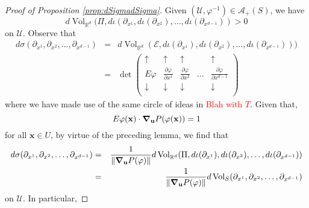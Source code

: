 \documentclass{article}
\renewcommand\det{\operatorname{det}}
\newcommand{\p}{\partial}
\newcommand{\f}[2]{\frac{#1}{#2}}
\theoremstyle{theorem}
\newcommand{\Vol}{\operatorname{Vol}}
\begin{document}
\begin{proof}[Proof of Proposition \ref{prop:dSigmadSigma}]
Given $(\mathcal{U},\varphi^{-1})\in\mathcal{A}_+(S)$, we have
\begin{equation*}
d\Vol_{\mathbb{R}^d}(\Pi,d\iota (\partial_{x^1}, d\iota(\partial_{x^2}),\dots,d\iota(\partial_{x^{d-1}}))>0
\end{equation*}
on $\mathcal{U}$. Observe that
\begin{eqnarray*}
d\sigma(\partial_{x^1},\partial_{x^2},\dots,\partial_{x^{d-1}}) &=& d\Vol_{\mathbb{R}^d}(\mathcal{E},d\iota(\partial_{x^1}),d\iota(\partial_{x^2}),\dots,d\iota(\partial_{x^{d-1}})))\\ 
&=& \det\begin{pmatrix}
    \uparrow & \uparrow & \uparrow & & \uparrow\\
    E \varphi & \f{\p\varphi}{\p x^1} & \f{\p\varphi}{\p x^2} & \dots & \f{\p\varphi}{\p x^{d-1}}  \\
    \downarrow & \downarrow & \downarrow & & \downarrow\\
    \end{pmatrix}
\end{eqnarray*}
where we have made use of the same circle of ideas in \textcolor{red}{Blah with $T$}. Given that,
\begin{equation*}
E\varphi(\mathbf{x})\cdot \grad_\mathbf{u} P(\varphi(\mathbf{x}))=1
\end{equation*}
for all $\mathbf{x}\in U$, by virtue of the preceding lemma, we find that
\begin{eqnarray*}
d\sigma(\partial_{x^1},\partial_{x^2},\dots,\partial_{x^{d-1}})&=&\frac{1}{\norm{\grad_{\mathbf{u}}P(\varphi) }}d\Vol_{\mathbb{R}^d}(\Pi,d\iota(\partial_{x^1}),d\iota(\partial_{x^2}),\dots,d\iota(\partial_{x^{d-1}})) \\
&=&\frac{1}{\norm{\grad_{\mathbf{u}}P(\varphi) }}  d\Vol_S(\partial_{x^1},\partial_{x^2},\dots,\partial_{x^{d-1}})
\end{eqnarray*}
on $\mathcal{U}$. In particular, 


\end{proof}
\end{document}
